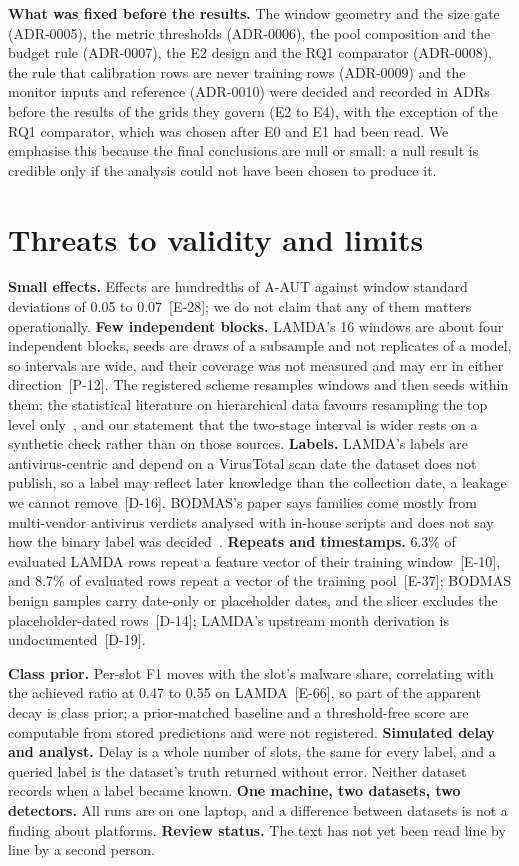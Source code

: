 \documentclass[conference,a4paper]{IEEEtran}
\newcommand{\clm}[1]{{\scriptsize[#1]}}
\begin{document}
\textbf{What was fixed before the results.} The window geometry and the size gate (ADR-0005), the metric thresholds (ADR-0006), the pool composition and the budget rule (ADR-0007), the E2 design and the RQ1 comparator (ADR-0008), the rule that calibration rows are never training rows (ADR-0009) and the monitor inputs and reference (ADR-0010) were decided and recorded in ADRs before the results of the grids they govern (E2 to E4), with the exception of the RQ1 comparator, which was chosen after E0 and E1 had been read. We emphasise this because the final conclusions are null or small: a null result is credible only if the analysis could not have been chosen to produce it.

\section{Threats to validity and limits}
\textbf{Small effects.} Effects are hundredths of A-AUT against window standard deviations of 0.05 to 0.07~\clm{E-28}; we do not claim that any of them matters operationally. \textbf{Few independent blocks.} LAMDA's 16 windows are about four independent blocks, seeds are draws of a subsample and not replicates of a model, so intervals are wide, and their coverage was not measured and may err in either direction~\clm{P-12}. The registered scheme resamples windows and then seeds within them; the statistical literature on hierarchical data favours resampling the top level only~\cite{davison1997bootstrap,ren2010hierarchical}, and our statement that the two-stage interval is wider rests on a synthetic check rather than on those sources.
\textbf{Labels.} LAMDA's labels are antivirus-centric and depend on a VirusTotal scan date the dataset does not publish, so a label may reflect later knowledge than the collection date, a leakage we cannot remove~\clm{D-16}. BODMAS's paper says families come mostly from multi-vendor antivirus verdicts analysed with in-house scripts and does not say how the binary label was decided~\cite{yang2021bodmas}.
\textbf{Repeats and timestamps.} 6.3\% of evaluated LAMDA rows repeat a feature vector of their training window~\clm{E-10}, and 8.7\% of evaluated rows repeat a vector of the training pool~\clm{E-37}; BODMAS benign samples carry date-only or placeholder dates, and the slicer excludes the placeholder-dated rows~\clm{D-14}; LAMDA's upstream month derivation is undocumented~\clm{D-19}.\par\textbf{Class prior.} Per-slot F1 moves with the slot's malware share, correlating with the achieved ratio at 0.47 to 0.55 on LAMDA~\clm{E-66}, so part of the apparent decay is class prior; a prior-matched baseline and a threshold-free score are computable from stored predictions and were not registered.
\textbf{Simulated delay and analyst.} Delay is a whole number of slots, the same for every label, and a queried label is the dataset's truth returned without error. Neither dataset records when a label became known.
\textbf{One machine, two datasets, two detectors.} All runs are on one laptop, and a difference between datasets is not a finding about platforms.
\textbf{Review status.} The text has not yet been read line by line by a second person.
\end{document}
